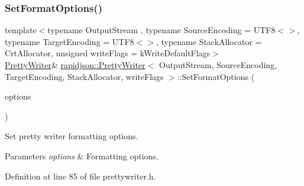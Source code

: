 \subsubsection{\texorpdfstring{SetFormatOptions()}{SetFormatOptions()}}
{\footnotesize\ttfamily template$<$typename Output\+Stream , typename Source\+Encoding  = U\+T\+F8$<$$>$, typename Target\+Encoding  = U\+T\+F8$<$$>$, typename Stack\+Allocator  = Crt\+Allocator, unsigned write\+Flags = k\+Write\+Default\+Flags$>$ \\
\mbox{\hyperlink{classrapidjson_1_1_pretty_writer}{Pretty\+Writer}}\& \mbox{\hyperlink{classrapidjson_1_1_pretty_writer}{rapidjson\+::\+Pretty\+Writer}}$<$ Output\+Stream, Source\+Encoding, Target\+Encoding, Stack\+Allocator, write\+Flags $>$\+::Set\+Format\+Options (\begin{DoxyParamCaption}\item[{\mbox{\hyperlink{namespacerapidjson_a084b31753ef2edefdeca8a5374eccc4b}{Pretty\+Format\+Options}}}]{options }\end{DoxyParamCaption})}



Set pretty writer formatting options. 


\begin{DoxyParams}{Parameters}
{\em options} & Formatting options. \\
\hline
\end{DoxyParams}


Definition at line 85 of file prettywriter.\+h.


\begin{DoxyCode}{0}

\end{DoxyCode}
\mbox{\label{classrapidjson_1_1_pretty_writer_a121686c29ca7fe071fa4108c46955ff0}} 
